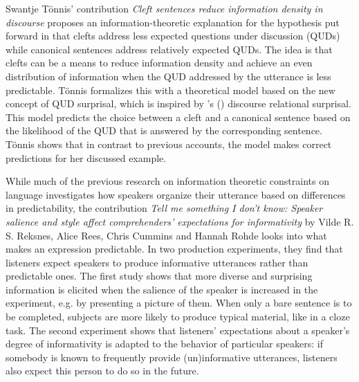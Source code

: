 \documentclass[output=paper,colorlinks,citecolor=brown]{langscibook}
\begin{document}
Swantje Tönnis' contribution \textit{Cleft sentences reduce information density in discourse} proposes an information-theoretic explanation for the hypothesis put forward in \citet{toennis2021} that clefts address less expected questions under discussion (QUDs) while canonical sentences address relatively expected QUDs. The idea is that clefts can be a means to reduce information density and achieve an even distribution of information when the QUD addressed by the utterance is less predictable. Tönnis formalizes this with a theoretical model based on the new concept of QUD surprisal, which is inspired by \citeauthor{asr.demberg2015}'s (\citeyear{asr.demberg2015}) discourse relational surprisal. This model predicts the choice between a cleft and a canonical sentence based on the likelihood of the QUD that is answered by the corresponding sentence. Tönnis shows that in contrast to previous accounts, the model makes correct predictions for her discussed example.

While much of the previous research on information theoretic constraints on language investigates how speakers organize their utterance based on differences in predictability, the contribution \textit{Tell me something I don’t know: Speaker salience and style affect comprehenders’ expectations for informativity} by Vilde R. S. Reksnes, Alice Rees, Chris Cummins and Hannah Rohde looks into what makes an expression predictable. In two production experiments, they find that listeners expect speakers to produce informative utterances rather than predictable ones. The first study shows that more diverse and surprising information is elicited when the salience of the speaker is increased in the experiment, e.g. by presenting a picture of them. When only a bare sentence is to be completed, subjects are more likely to produce typical  material, like in a cloze task. The second experiment shows that listeners' expectations about a speaker's degree of informativity is adapted to the behavior of particular speakers: if somebody is known to frequently provide (un)informative utterances, listeners also expect this person to do so in the future.
\end{document}
